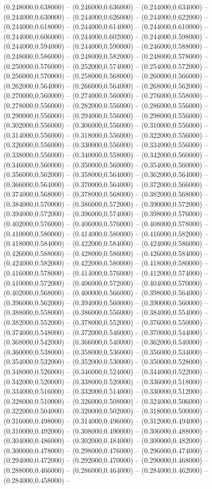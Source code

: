 (0.248000,0.638000) -- (0.246000,0.636000) -- (0.244000,0.634000) -- (0.244000,0.630000) -- (0.244000,0.626000) -- (0.244000,0.622000) -- (0.244000,0.618000) -- (0.244000,0.614000) -- (0.244000,0.610000) -- (0.244000,0.606000) -- (0.244000,0.602000) -- (0.244000,0.598000) -- (0.244000,0.594000) -- (0.244000,0.590000) -- (0.246000,0.588000) -- (0.248000,0.586000) -- (0.248000,0.582000) -- (0.248000,0.578000) -- (0.250000,0.576000) -- (0.252000,0.574000) -- (0.254000,0.572000) -- (0.256000,0.570000) -- (0.258000,0.568000) -- (0.260000,0.566000) -- (0.262000,0.564000) -- (0.266000,0.564000) -- (0.268000,0.562000) -- (0.270000,0.560000) -- (0.274000,0.560000) -- (0.276000,0.558000) -- (0.278000,0.556000) -- (0.282000,0.556000) -- (0.286000,0.556000) -- (0.290000,0.556000) -- (0.294000,0.556000) -- (0.298000,0.556000) -- (0.302000,0.556000) -- (0.306000,0.556000) -- (0.310000,0.556000) -- (0.314000,0.556000) -- (0.318000,0.556000) -- (0.322000,0.556000) -- (0.326000,0.556000) -- (0.330000,0.556000) -- (0.334000,0.556000) -- (0.338000,0.556000) -- (0.340000,0.558000) -- (0.342000,0.560000) -- (0.346000,0.560000) -- (0.350000,0.560000) -- (0.354000,0.560000) -- (0.356000,0.562000) -- (0.358000,0.564000) -- (0.362000,0.564000) -- (0.366000,0.564000) -- (0.370000,0.564000) -- (0.372000,0.566000) -- (0.374000,0.568000) -- (0.378000,0.568000) -- (0.382000,0.568000) -- (0.384000,0.570000) -- (0.386000,0.572000) -- (0.390000,0.572000) -- (0.394000,0.572000) -- (0.396000,0.574000) -- (0.398000,0.576000) -- (0.402000,0.576000) -- (0.406000,0.576000) -- (0.408000,0.578000) -- (0.410000,0.580000) -- (0.414000,0.580000) -- (0.416000,0.582000) -- (0.418000,0.584000) -- (0.422000,0.584000) -- (0.424000,0.586000) -- (0.426000,0.588000) -- (0.428000,0.586000) -- (0.426000,0.584000) -- (0.424000,0.582000) -- (0.422000,0.580000) -- (0.418000,0.580000) -- (0.416000,0.578000) -- (0.414000,0.576000) -- (0.412000,0.574000) -- (0.410000,0.572000) -- (0.406000,0.572000) -- (0.404000,0.570000) -- (0.402000,0.568000) -- (0.400000,0.566000) -- (0.398000,0.564000) -- (0.396000,0.562000) -- (0.394000,0.560000) -- (0.390000,0.560000) -- (0.388000,0.558000) -- (0.386000,0.556000) -- (0.384000,0.554000) -- (0.382000,0.552000) -- (0.378000,0.552000) -- (0.376000,0.550000) -- (0.374000,0.548000) -- (0.372000,0.546000) -- (0.370000,0.544000) -- (0.368000,0.542000) -- (0.366000,0.540000) -- (0.362000,0.540000) -- (0.360000,0.538000) -- (0.358000,0.536000) -- (0.356000,0.534000) -- (0.354000,0.532000) -- (0.352000,0.530000) -- (0.350000,0.528000) -- (0.348000,0.526000) -- (0.346000,0.524000) -- (0.344000,0.522000) -- (0.342000,0.520000) -- (0.338000,0.520000) -- (0.336000,0.518000) -- (0.334000,0.516000) -- (0.332000,0.514000) -- (0.330000,0.512000) -- (0.328000,0.510000) -- (0.326000,0.508000) -- (0.324000,0.506000) -- (0.322000,0.504000) -- (0.320000,0.502000) -- (0.318000,0.500000) -- (0.316000,0.498000) -- (0.314000,0.496000) -- (0.312000,0.494000) -- (0.310000,0.492000) -- (0.308000,0.490000) -- (0.306000,0.488000) -- (0.304000,0.486000) -- (0.302000,0.484000) -- (0.300000,0.482000) -- (0.300000,0.478000) -- (0.298000,0.476000) -- (0.296000,0.474000) -- (0.294000,0.472000) -- (0.292000,0.470000) -- (0.290000,0.468000) -- (0.288000,0.466000) -- (0.286000,0.464000) -- (0.284000,0.462000) -- (0.284000,0.458000) -- 